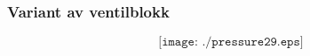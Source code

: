 \documentclass[aspectratio=169,xcolor=dvipsnames]{beamer}
\begin{document}
%
%
%
%
\begin{frame}
	\frametitle{Variant av ventilblokk}

	$$\texttt{[image: ./pressure29.eps]}$$
\end{frame}
\end{document}
